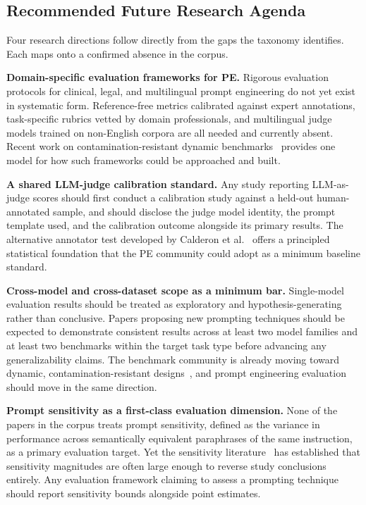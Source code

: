 \documentclass[journal]{IEEEtran}
\begin{document}
\subsection{Recommended Future Research Agenda}

Four research directions follow directly from the gaps the taxonomy
identifies. Each maps onto a confirmed absence in the corpus.

\textbf{Domain-specific evaluation frameworks for PE.} Rigorous
evaluation protocols for clinical, legal, and multilingual prompt
engineering do not yet exist in systematic form. Reference-free metrics
calibrated against expert annotations, task-specific rubrics vetted by
domain professionals, and multilingual judge models trained on
non-English corpora are all needed and currently absent. Recent work
on contamination-resistant dynamic benchmarks~\cite{wildbench2024}
provides one model for how such frameworks could be approached and built.

\textbf{A shared LLM-judge calibration standard.} Any study reporting
LLM-as-judge scores should first conduct a calibration study against a
held-out human-annotated sample, and should disclose the judge model
identity, the prompt template used, and the calibration outcome alongside its primary
results. The alternative annotator test developed by Calderon
et al.~\cite{alternativeannotator2025} offers a principled
statistical foundation that the PE community could adopt as a minimum baseline
standard.

\textbf{Cross-model and cross-dataset scope as a minimum bar.}
Single-model evaluation results should be treated as exploratory and
hypothesis-generating rather than conclusive. Papers proposing new
prompting techniques should be expected to demonstrate consistent results across at
least two model families and at least two benchmarks within the target
task type before advancing any generalizability claims. The benchmark
community is already moving toward dynamic, contamination-resistant
designs~\cite{ni2025benchmarks}, and prompt engineering evaluation should
move in the same direction.

\textbf{Prompt sensitivity as a first-class evaluation dimension.}
None of the papers in the corpus treats prompt sensitivity, defined as the
variance in performance across semantically equivalent paraphrases
of the same instruction, as a primary evaluation target. Yet the
sensitivity literature~\cite{sclar2023formatting, promptsensitivity2025,
butterfly2024} has established that sensitivity magnitudes are often large
enough to reverse study conclusions entirely. Any evaluation framework claiming
to assess a prompting technique should report sensitivity bounds
alongside point estimates.
\end{document}
